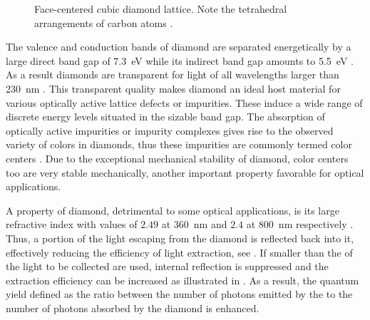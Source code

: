   \begin{figure}[!htb]
		\centering
		\caption[Face-centered cubic diamond lattice]{Face-centered cubic diamond lattice. Note the tetrahedral arrangements of carbon atoms \cite{demtroder2000experimentalphysik}.}
		\label{fig::diamond_lattice}
	\end{figure}

  The valence and conduction bands of diamond are separated energetically by a large direct band gap of \SI{7.3}{\eV} while its indirect band gap amounts to \SI{5.5}{\eV} \cite{Clark1964, Saslow1966}. As a result diamonds are transparent for light of all wavelengths larger than \SI{230}{\nm} \cite{Mildren2008}. This transparent quality makes diamond an ideal host material for various optically active lattice defects or impurities. These induce a wide range of discrete energy levels situated in the sizable band gap. The absorption of optically active impurities or impurity complexes gives rise to the observed variety of colors in diamonds, thus these impurities are commonly termed color centers \cite{Neu2012}. Due to the exceptional mechanical stability of diamond, color centers too are very stable mechanically, another important property favorable for optical applications.

  A property of diamond, detrimental to some optical applications, is its large refractive index with values of $2.49$ at \SI{360}{\nm} and $2.4$ at \SI{800}{\nm} respectively \cite{Zaitsev2001}. Thus, a portion of the light escaping from the diamond is reflected back into it, effectively reducing the efficiency of light extraction, see . If \nds smaller than the \wl of the light to be collected are used, internal reflection is suppressed and the extraction efficiency can be increased \cite{Beveratos2001} as illustrated in . As a result, the quantum yield defined as the ratio between the number of photons emitted by the \siv to the number of photons absorbed by the diamond is enhanced.

